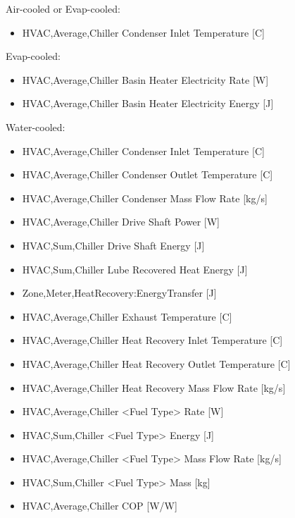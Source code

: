 Air-cooled or Evap-cooled:

\begin{itemize}
\tightlist
\item
  HVAC,Average,Chiller Condenser Inlet Temperature {[}C{]}
\end{itemize}

Evap-cooled:

\begin{itemize}
\item
  HVAC,Average,Chiller Basin Heater Electricity Rate {[}W{]}
\item
  HVAC,Average,Chiller Basin Heater Electricity Energy {[}J{]}
\end{itemize}

Water-cooled:

\begin{itemize}
\item
  HVAC,Average,Chiller Condenser Inlet Temperature {[}C{]}
\item
  HVAC,Average,Chiller Condenser Outlet Temperature {[}C{]}
\item
  HVAC,Average,Chiller Condenser Mass Flow Rate {[}kg/s{]}
\item
  HVAC,Average,Chiller Drive Shaft Power {[}W{]}
\item
  HVAC,Sum,Chiller Drive Shaft Energy {[}J{]}
\item
  HVAC,Sum,Chiller Lube Recovered Heat Energy {[}J{]}
\item
  Zone,Meter,HeatRecovery:EnergyTransfer {[}J{]}
\item
  HVAC,Average,Chiller Exhaust Temperature {[}C{]}
\item
  HVAC,Average,Chiller Heat Recovery Inlet Temperature {[}C{]}
\item
  HVAC,Average,Chiller Heat Recovery Outlet Temperature {[}C{]}
\item
  HVAC,Average,Chiller Heat Recovery Mass Flow Rate {[}kg/s{]}
\item
  HVAC,Average,Chiller \textless{}Fuel Type\textgreater{} Rate {[}W{]}
\item
  HVAC,Sum,Chiller \textless{}Fuel Type\textgreater{} Energy {[}J{]}
\item
  HVAC,Average,Chiller \textless{}Fuel Type\textgreater{} Mass Flow Rate {[}kg/s{]}
\item
  HVAC,Sum,Chiller \textless{}Fuel Type\textgreater{} Mass {[}kg{]}
\item
  HVAC,Average,Chiller COP {[}W/W{]}
\end{itemize}

